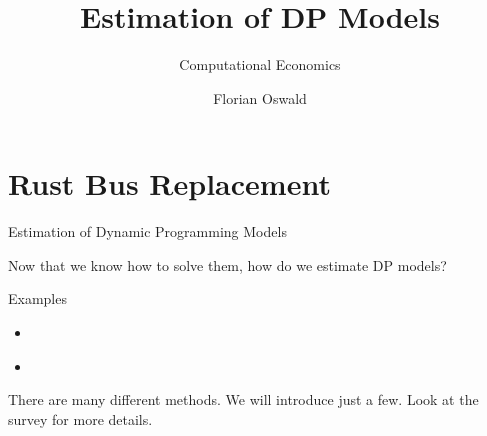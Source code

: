 \documentclass[english]{beamer}
\begin{document}
\title{Estimation of DP Models}

\subtitle{Computational Economics}
\author{Florian Oswald}


\frame{\titlepage} 


\section{Rust Bus Replacement}

\begin{frame}
\tableofcontents[currentsection] 
\end{frame}





\begin{frame}{Estimation of Dynamic Programming Models}
\begin{midi}
\item Now that we know how to solve them, how do we estimate DP models?
\item Examples
\begin{itemize}
\item \cite{rustbus}
\item \cite{BLP}
\end{itemize}
\item There are many different methods. We will introduce just a few. Look at the survey \cite{Aguirre} for more details.
\end{midi}
\end{frame}
\end{document}

